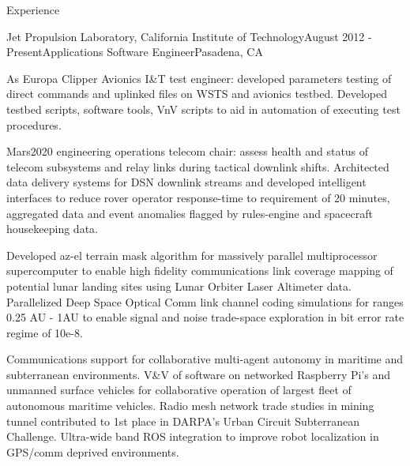 \documentclass{resume} %
\begin{document}





\begin{rSection}{Experience}
\begin{rSubsection}{Jet Propulsion Laboratory, California Institute of Technology}{August 2012 - Present}{Applications Software Engineer}{Pasadena, CA}


\item As Europa Clipper Avionics I\&T test engineer: developed parameters testing of direct commands and uplinked files on WSTS and avionics testbed. Developed testbed scripts, software tools, VnV scripts to aid in automation of executing test procedures.

\item Mars2020 engineering operations telecom chair: assess health and status of telecom subsystems and relay links during tactical downlink shifts. Architected data delivery systems for DSN downlink streams and developed intelligent interfaces to reduce rover operator response-time to requirement of 20 minutes, aggregated data and event anomalies flagged by rules-engine and spacecraft housekeeping data.


\item Developed az-el terrain mask algorithm for massively parallel multiprocessor supercomputer to enable high fidelity communications link coverage mapping of potential lunar landing sites using Lunar Orbiter Laser Altimeter data. Parallelized Deep Space Optical Comm link channel coding simulations for ranges 0.25 AU - 1AU to enable signal and noise trade-space exploration in bit error rate regime of 10e-8. 


\item Communications support for collaborative multi-agent autonomy in maritime and subterranean environments. V\&V of software on networked Raspberry Pi’s and unmanned surface vehicles for collaborative operation of largest fleet of autonomous maritime vehicles. Radio mesh network trade studies in mining tunnel contributed to 1st place in DARPA’s Urban Circuit Subterranean Challenge. Ultra-wide band ROS integration to improve robot localization in GPS/comm deprived environments.


\end{rSubsection}
\end{rSection}
\end{document}
